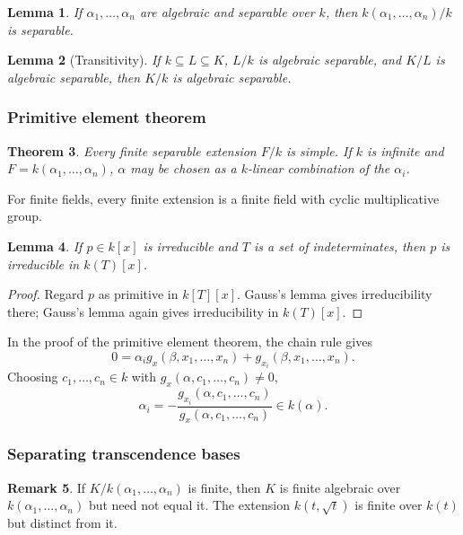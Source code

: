 \documentclass[12pt]{article}
\theoremstyle{plain}
\newtheorem{thm}{Theorem}[subsection] %
\newtheorem{lemma}[thm]{Lemma}
\theoremstyle{definition}
\newtheorem{remark}[thm]{Remark}
\begin{document}
\begin{lemma}
If $\alpha_1,\ldots,\alpha_n$ are algebraic and separable over $k$, then $k(\alpha_1,\ldots,\alpha_n)/k$ is separable.
\end{lemma}

\begin{lemma}[Transitivity]
If $k\subseteq L\subseteq K$, $L/k$ is algebraic separable, and $K/L$ is algebraic separable, then $K/k$ is algebraic separable.
\end{lemma}

\subsubsection*{Primitive element theorem}

\begin{thm}
Every finite separable extension $F/k$ is simple. If $k$ is infinite and $F=k(\alpha_1,\ldots,\alpha_n)$, $\alpha$ may be chosen as a $k$-linear combination of the $\alpha_i$.
\end{thm}

For finite fields, every finite extension is a finite field with cyclic multiplicative group.

\begin{lemma}
If $p\in k[x]$ is irreducible and $T$ is a set of indeterminates, then $p$ is irreducible in $k(T)[x]$.
\end{lemma}
\begin{proof}
Regard $p$ as primitive in $k[T][x]$. Gauss's lemma gives irreducibility there; Gauss's lemma again gives irreducibility in $k(T)[x]$.
\end{proof}

In the proof of the primitive element theorem, the chain rule gives
\[
0=\alpha_i g_x(\beta,x_1,\ldots,x_n)+g_{x_i}(\beta,x_1,\ldots,x_n).
\]
Choosing $c_1,\ldots,c_n\in k$ with $g_x(\alpha,c_1,\ldots,c_n)\ne 0$,
\[
\alpha_i=-\frac{g_{x_i}(\alpha,c_1,\ldots,c_n)}{g_x(\alpha,c_1,\ldots,c_n)}\in k(\alpha).
\]

\subsubsection*{Separating transcendence bases}

\begin{remark}
If $K/k(\alpha_1,\ldots,\alpha_n)$ is finite, then $K$ is finite algebraic over $k(\alpha_1,\ldots,\alpha_n)$ but need not equal it. The extension $k(t,\sqrt{t})$ is finite over $k(t)$ but distinct from it.
\end{remark}
\end{document}
